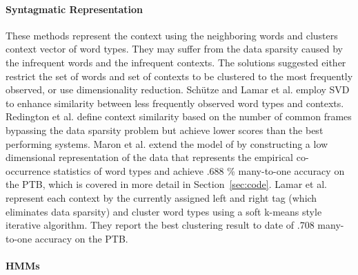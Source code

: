 \paragraph{Syntagmatic Representation}  
These methods represent the context using the neighboring words and
clusters context vector of word types.  They may suffer from the data
sparsity caused by the infrequent words and the infrequent contexts.
The solutions suggested either restrict the set of words and set of
contexts to be clustered to the most frequently observed, or use
dimensionality reduction.  Sch\"utze
 and Lamar et
al.  employ SVD to enhance similarity
between less frequently observed word types and contexts.  Redington
et al.  define context
similarity based on the number of common frames bypassing the data
sparsity problem but achieve lower scores than the best performing
systems.  Maron et al.  extend the model of
\cite{globerson2007euclidean} by constructing a low dimensional
representation of the data that represents the empirical co-occurrence
statistics of word types and achieve .688 \% many-to-one accuracy on
the PTB, which is covered in more detail in Section~\ref{sec:code}.
Lamar et al.  represent each
context by the currently assigned left and right tag (which eliminates
data sparsity) and cluster word types using a soft k-means style
iterative algorithm.  They report the best clustering result to date
of .708 many-to-one accuracy on the PTB.

\paragraph{HMMs}

